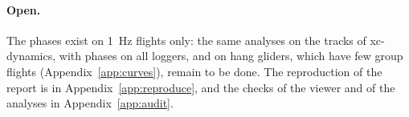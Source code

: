 \paragraph{Open.} The phases exist on 1~Hz flights only: the same analyses on the tracks of
xc-dynamics, with phases on all loggers, and on hang gliders, which have few group flights
(Appendix~\ref{app:curves}), remain to be done. The reproduction of the report is in
Appendix~\ref{app:reproduce}, and the checks of the viewer and of the analyses in
Appendix~\ref{app:audit}.
